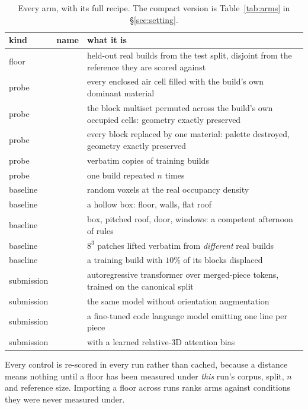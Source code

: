 \begin{table}[t]
\centering
\small
\caption{Every arm, with its full recipe. The compact version is
Table~\ref{tab:arms} in \S\ref{sec:setting}.}
\label{tab:arms-full}
\begin{tabular}{llp{7.4cm}}
\toprule
kind & name & what it is \\
\midrule
floor      & \realheld{}      & held-out real builds from the test split, disjoint from the reference they are scored against \\
\midrule
probe      & \solidify{}      & every enclosed air cell filled with the build's own dominant material \\
probe      & \matshuffle{}    & the block multiset permuted across the build's own occupied cells: geometry exactly preserved \\
probe      & \monochrome{}    & every block replaced by one material: palette destroyed, geometry exactly preserved \\
probe      & \traincopy{}     & verbatim copies of training builds \\
probe      & \singlemode{}    & one build repeated $n$ times \\
\midrule
baseline   & \randomvox{}     & random voxels at the real occupancy density \\
baseline   & \hollowbox{}     & a hollow box: floor, walls, flat roof \\
baseline   & \gabled{}        & box, pitched roof, door, windows: a competent afternoon of rules \\
baseline   & \patchstitch{}   & $8^3$ patches lifted verbatim from \emph{different} real builds \\
baseline   & \copynoise{}     & a training build with $10\%$ of its blocks displaced \\
\midrule
submission & \voxar{}         & autoregressive transformer over merged-piece tokens, trained on the canonical split \\
submission & \voxarun{}       & the same model without orientation augmentation \\
submission & \llmft{}         & a fine-tuned code language model emitting one line per piece \\
submission & \llmgeo{}        & \llmft{} with a learned relative-{3D} attention bias \\
\bottomrule
\end{tabular}
\end{table}

Every control is re-scored in every run rather than cached, because a distance
means nothing until a floor has been measured under \emph{this} run's corpus,
split, $n$ and reference size. Importing a floor across runs ranks arms against
conditions they were never measured under.

